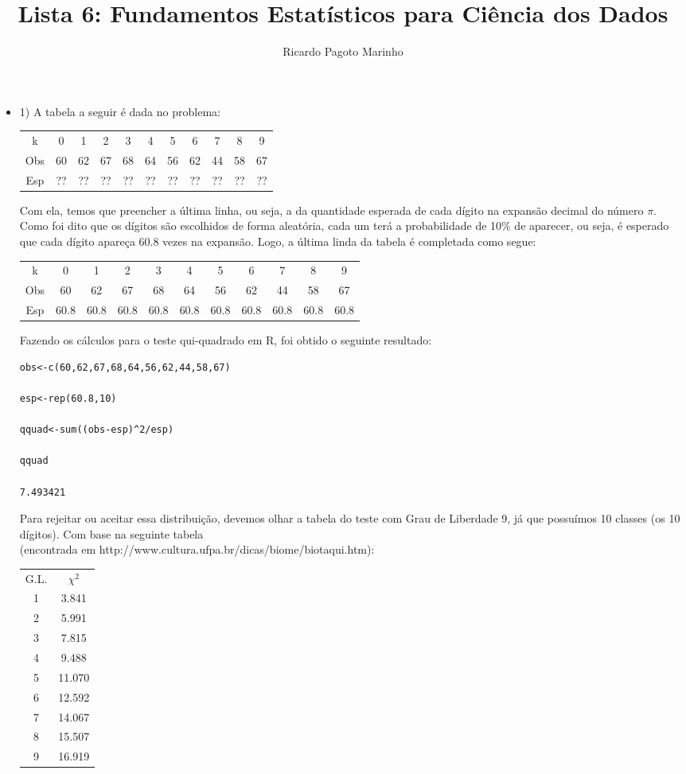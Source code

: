 \documentclass[11pt,a4paper]{book}
\title{Lista 6: Fundamentos Estatísticos para Ciência dos Dados}
\author{Ricardo Pagoto Marinho}
\begin{document}
\maketitle
	\begin{itemize}
		\item 1)
		A tabela a seguir é dada no problema:
		
		\begin{tabular}{c c c c c c c c c c c}
		\hline
		k&0&1&2&3&4&5&6&7&8&9\\
		Obs&60&62&67&68&64&56&62&44&58&67\\
		Esp&??&??&??&??&??&??&??&??&??&??\\
		\hline
		\end{tabular}				
		
		Com ela, temos que preencher a última linha, ou seja, a da quantidade esperada de cada dígito na expansão decimal do número $\pi$.
		Como foi dito que os dígitos são escolhidos de forma aleatória, cada um terá a probabilidade de 10\% de aparecer, ou seja, é esperado que cada dígito apareça 60.8 vezes na expansão.
		Logo, a última linda da tabela é completada como segue:
		
		\begin{tabular}{c c c c c c c c c c c}
		\hline
		k&0&1&2&3&4&5&6&7&8&9\\
		Obs&60&62&67&68&64&56&62&44&58&67\\
		Esp&60.8&60.8&60.8&60.8&60.8&60.8&60.8&60.8&60.8&60.8\\
		\hline
		\end{tabular}
		
		Fazendo os cálculos para o teste qui-quadrado em R, foi obtido o seguinte resultado:
		\begin{lstlisting}
obs<-c(60,62,67,68,64,56,62,44,58,67)

esp<-rep(60.8,10)

qquad<-sum((obs-esp)^2/esp)
		
qquad

7.493421		
		\end{lstlisting}
		Para rejeitar ou aceitar essa distribuição, devemos olhar a tabela do teste com Grau de Liberdade 9, já que possuímos 10 classes (os 10 dígitos).
		Com base na seguinte tabela\\(encontrada em http://www.cultura.ufpa.br/dicas/biome/biotaqui.htm):
		
		\begin{tabular}{c c}
		\hline
		G.L.&$\chi^2$\\
		1&3.841\\
		2&5.991\\
		3&7.815\\
		4&9.488\\
		5&11.070\\
		6&12.592\\
		7&14.067\\
		8&15.507\\
		9&16.919\\
		\hline
		\end{tabular}
		

\end{itemize}
\end{document}
